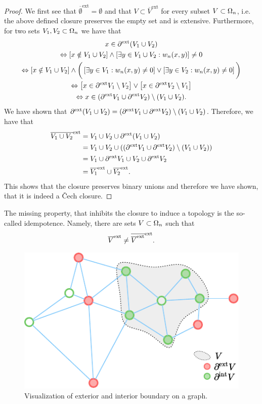%
\begin{proof}

We first see that $\overline{\emptyset}^{\text{ext}}=\emptyset$ and that $V\subset \overline{V}^{\text{ext}}$ for every subset $V\subset\Omega_n$, i.e. the above defined closure preserves the empty set and is extensive. Furthermore, for two sets $V_1,V_2\subset \Omega_n$ we have that
%
\begin{gather*} 
x\in \partial^{\text{ext}} (V_1\cup V_2)\\
\Leftrightarrow\left[x\notin V_1\cup V_2\right]\wedge \left[\exists y\in V_1\cup V_2: w_n(x,y) \right]\neq 0\\
\Leftrightarrow 
\left[x\notin V_1\cup V_2\right]\wedge
\bigg(\left[\exists y\in V_1: w_n(x,y) \neq 0 \right]\vee
\left[\exists y\in V_2: w_n(x,y) \neq 0 \right]\bigg)\\
\Leftrightarrow \left[x\in \partial^{\text{ext}} V_1\setminus V_2\right]\vee
\left[x\in  \partial^{\text{ext}} V_2 \setminus V_1 \right]\\
\Leftrightarrow x\in (\partial^{\text{ext}} V_1 \cup \partial^{\text{ext}} V_2)\setminus (V_1\cup V_2).
\end{gather*}
%
We have shown that $\partial^{\text{ext}} (V_1\cup V_2)=(\partial^{\text{ext}} V_1 \cup \partial^{\text{ext}} V_2)\setminus (V_1\cup V_2)$. Therefore, we have that
%
\begin{align*}
\overline{V_1\cup V_2}^{\text{ext}} &= 
V_1\cup V_2 \cup \partial^{\text{ext}} (V_1\cup V_2)\\
&= V_1\cup V_2 \cup ((\partial^{\text{ext}} V_1 \cup \partial^{\text{ext}} V_2)\setminus (V_1\cup V_2))\\
&= V_1\cup \partial^{\text{ext}} V_1 \cup V_2 \cup \partial^{\text{ext}} V_2\\
&= \overline{V_1}^{\text{ext}}\cup\overline{V_2}^{\text{ext}}.
\end{align*}
%
This shows that the closure preserves binary unions and therefore we have shown, that it is indeed a Čech closure.
\end{proof}
%
%
%
\noindent%
The missing property, that inhibits the closure to induce a topology is the so-called idempotence. Namely, there are sets $V\subset \Omega_n$ such that
%
\begin{align*}
\overline{V}^{\text{ext}} \neq \overline{\overline{V}^{\text{ext}}}^{\text{ext}}.
\end{align*}
%
\begin{figure}
\centering
\includegraphics{atelier/SSL/boundary.pdf}
\caption{Visualization of exterior and interior boundary on a graph.}\label{fig:graphb}
\end{figure}
